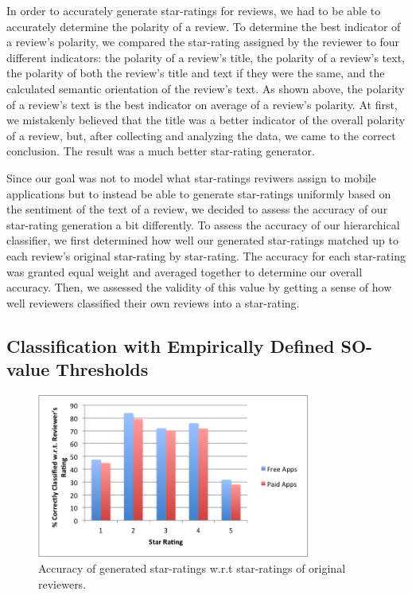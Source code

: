 \documentclass[11pt]{report} %
\begin{document}
In order to accurately generate star-ratings for reviews, we had to be able to accurately determine the polarity of a review. To determine the best indicator of a review's polarity, we compared the star-rating assigned by the reviewer to four different indicators: the polarity of a review's title, the polarity of a review's text, the polarity of both the review's title and text if they were the same, and the calculated semantic orientation of the review's text. As shown above, the polarity of a review's text is the best indicator on average of a review's polarity. At first, we mistakenly believed that the title was a better indicator of the overall polarity of a review, but, after collecting and analyzing the data, we came to the correct conclusion. The result was a much better star-rating generator. 

Since our goal was not to model what star-ratings reviwers assign to mobile applications but to instead be able to generate star-ratings uniformly based on the sentiment of the text of a review, we decided to assess the accuracy of our star-rating generation a bit differently. To assess the accuracy of our hierarchical classifier, we first determined how well our generated star-ratings matched up to each review's original star-rating by star-rating. The accuracy for each star-rating was granted equal weight and averaged together to determine our overall accuracy. Then, we assessed the validity of this value by getting a sense of how well reviewers classified their own reviews into a star-rating.


\subsection{Classification with Empirically Defined SO-value Thresholds}
\label{subsection:empirically_defined_so}
\begin{figure}[H]
	\centering
	\includegraphics[width=0.8\textwidth]{data/pmi-cue-accuracy.png}
	\caption{Accuracy of generated star-ratings w.r.t star-ratings of original reviewers.}
	\label{fig:pmi-cue-acc}
	\end{figure}
\end{document}

